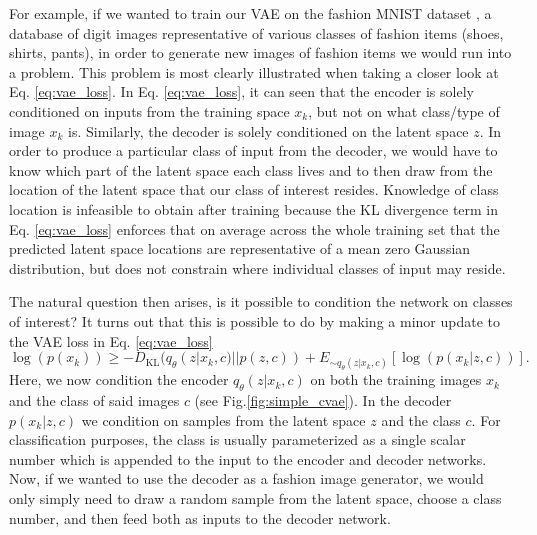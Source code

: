 For example, if we wanted to train our \ac{VAE} on 
the fashion MNIST dataset \cite{DBLP:journals/corr/abs-1708-07747}, 
a database of digit images representative of various classes 
of fashion items (shoes, shirts, pants), in order to 
generate new images of fashion items we would run into 
a problem. This problem is most clearly illustrated when 
taking a closer look at Eq. \ref{eq:vae_loss}. In 
Eq. \ref{eq:vae_loss}, it can seen that the encoder 
is solely conditioned on inputs from the training space 
$x_k$, but not on what class/type of image $x_k$ is. Similarly, 
the decoder is solely conditioned on the latent space $z$. In order 
to produce a particular class of input from the decoder, we would have 
to know which part of the latent space each class lives and to then 
draw from the location of the latent space that our class of 
interest resides. Knowledge of class location is infeasible to obtain 
after training because the KL 
divergence term in Eq. \ref{eq:vae_loss} enforces that 
on average across the whole training set that the predicted 
latent space locations are representative 
of a mean zero Gaussian distribution, but does not constrain where 
individual classes of input may reside.

The natural question then arises, is it possible to condition 
the network on classes of interest? It turns out that this is 
possible to do by making a minor update to the 
\ac{VAE} loss in Eq. \ref{eq:vae_loss}
\begin{equation}
    \log(p(x_k)) \geq - D_{\textrm{KL}}(q_{\theta}(z|x_k,c) || p(z,c)) + 
    E_{\sim q_{\theta}(z|x_k,c)}[ \log({p(x_k|z,c)})].
\end{equation}
Here, we now condition the encoder $q_{\theta}(z|x_k,c)$ on both 
the training images $x_k$ and the class of said images $c$ (see Fig.\ref{fig:simple_cvae}). In the decoder 
$p(x_k|z,c)$ we condition on samples from the latent space $z$ and the 
class $c$. For classification purposes, the class is usually 
parameterized as a single scalar number which is appended to the input to 
the encoder and decoder networks. Now, if we wanted to use the decoder 
as a fashion image generator, we would only simply need to draw a 
random sample from the latent space, choose a class number, and then 
feed both as inputs to the decoder network. 

